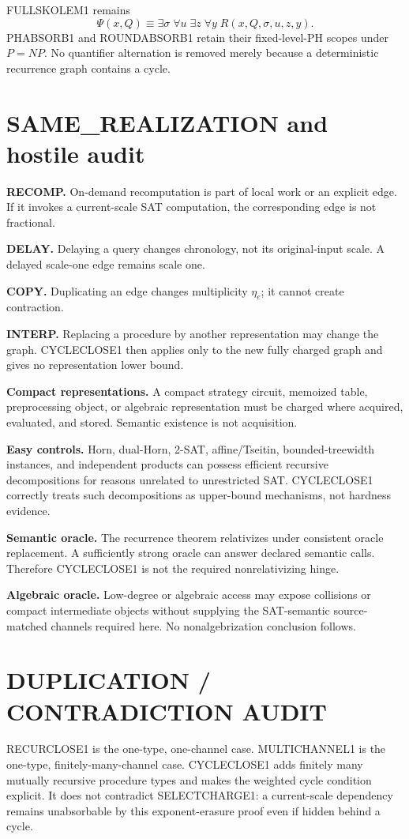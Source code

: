 \documentclass[11pt]{article}
\begin{document}
FULLSKOLEM1 remains
\[
\Psi(x,Q)\equiv
\exists\sigma\;\forall u\;\exists z\;\forall y\;
R(x,Q,\sigma,u,z,y).
\]
PHABSORB1 and ROUNDABSORB1 retain their fixed-level-PH scopes under \(P=NP\). No quantifier alternation is removed merely because a deterministic recurrence graph contains a cycle.

\section*{SAME\_REALIZATION and hostile audit}
\textbf{RECOMP.} On-demand recomputation is part of local work or an explicit edge. If it invokes a current-scale SAT computation, the corresponding edge is not fractional.

\textbf{DELAY.} Delaying a query changes chronology, not its original-input scale. A delayed scale-one edge remains scale one.

\textbf{COPY.} Duplicating an edge changes multiplicity \(\eta_e\); it cannot create contraction.

\textbf{INTERP.} Replacing a procedure by another representation may change the graph. CYCLECLOSE1 then applies only to the new fully charged graph and gives no representation lower bound.

\textbf{Compact representations.} A compact strategy circuit, memoized table, preprocessing object, or algebraic representation must be charged where acquired, evaluated, and stored. Semantic existence is not acquisition.

\textbf{Easy controls.} Horn, dual-Horn, 2-SAT, affine/Tseitin, bounded-treewidth instances, and independent products can possess efficient recursive decompositions for reasons unrelated to unrestricted SAT. CYCLECLOSE1 correctly treats such decompositions as upper-bound mechanisms, not hardness evidence.

\textbf{Semantic oracle.} The recurrence theorem relativizes under consistent oracle replacement. A sufficiently strong oracle can answer declared semantic calls. Therefore CYCLECLOSE1 is not the required nonrelativizing hinge.

\textbf{Algebraic oracle.} Low-degree or algebraic access may expose collisions or compact intermediate objects without supplying the SAT-semantic source-matched channels required here. No nonalgebrization conclusion follows.

\section*{DUPLICATION / CONTRADICTION AUDIT}
RECURCLOSE1 is the one-type, one-channel case. MULTICHANNEL1 is the one-type, finitely-many-channel case. CYCLECLOSE1 adds finitely many mutually recursive procedure types and makes the weighted cycle condition explicit. It does not contradict SELECTCHARGE1: a current-scale dependency remains unabsorbable by this exponent-erasure proof even if hidden behind a cycle.
\end{document}
